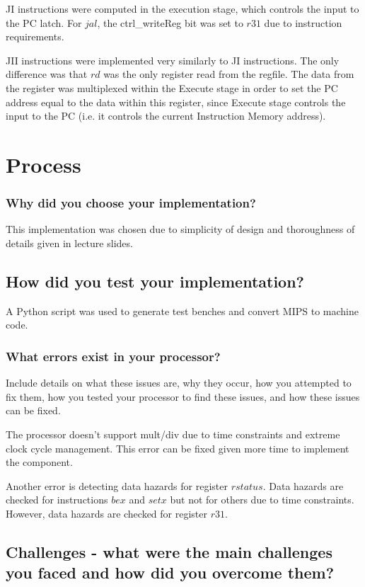 \documentclass[a4paper,11pt]{article}
\begin{document}
JI instructions were computed in the execution stage, which controls the input to the PC latch. For $jal$, the ctrl_writeReg bit was set to $r31$ due to instruction requirements.

JII instructions were implemented very similarly to JI instructions. The only difference was that $rd$ was the only register read from the regfile. The data from the register was multiplexed within the Execute stage in order to set the PC address equal to the data within this register, since Execute stage controls the input to the PC (i.e. it controls the current Instruction Memory address). 


\newpage

\section{Process}

\subsubsection*{Why did you choose your implementation?}
This implementation was chosen due to simplicity of design and thoroughness of details given in lecture slides.
\subsection*{How did you test your implementation?}
A Python script was used to generate test benches and convert MIPS to machine code.

\subsubsection*{What errors exist in your processor?} Include details on what these issues are, why they occur, how you attempted to fix them, how you tested your processor to find these issues, and how these issues can be fixed.

The processor doesn't support mult/div due to time constraints and extreme clock cycle management. This error can be fixed given more time to implement the component. 

Another error is detecting data hazards for register $rstatus$. Data hazards are checked for instructions $bex$ and $setx$ but not for others due to time constraints. However, data hazards are checked for register $r31$.

\subsection*{Challenges - what were the main challenges you faced and how did you
overcome them?}
\end{document}
